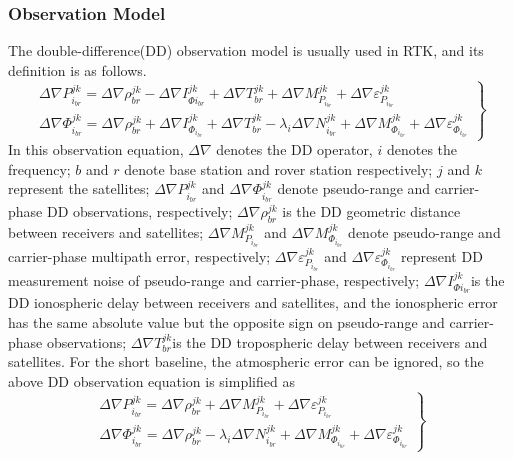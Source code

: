 \documentclass[final,3p,times]{elsarticle}
\begin{document}
	\subsubsection{Observation Model}
	The double-difference(DD) observation model is usually used in RTK, and its definition is as follows\cite{teunissen2017springer}.
	\begin{equation}
	\left. \begin{array}{l}
	\Delta \nabla P_{{i_{br}}}^{jk} = \Delta \nabla \rho _{br}^{jk} - \Delta \nabla I_{\Phi {i_{br}}}^{jk} + \Delta \nabla  T_{br}^{jk} + \Delta \nabla  M_{{P_{{i_{br}}}}}^{jk} + \Delta \nabla \varepsilon _{{P_{{i_{br}}}}}^{jk}\\
	\Delta \nabla \Phi _{{i_{br}}}^{jk} = \Delta \nabla \rho _{br}^{jk} + \Delta \nabla I_{{\Phi _{{i_{br}}}}}^{jk} + \Delta \nabla T_{br}^{jk} - {\lambda _i}\Delta \nabla N_{{i_{br}}}^{jk} + \Delta \nabla  M_{{\Phi _{{i_{br}}}}}^{jk} + \Delta \nabla \varepsilon _{{\Phi _{{i_{br}}}}}^{jk}
	\end{array} \right\}
	\label{eq_dd_obs}
	\end{equation}
	In this observation equation, $\Delta \nabla $ denotes the DD operator, $i$ denotes the frequency; $b$ and $r$ denote base station and rover station respectively; $j$ and $k$ represent the satellites;
	$\Delta \nabla P_{{{i}_{br}}}^{jk}$ and $\Delta \nabla \Phi _{{{i}_{br}}}^{jk}$ denote pseudo-range and carrier-phase DD observations, respectively; 
	$\Delta \nabla \rho _{br}^{jk}$ is the DD geometric distance between receivers and satellites; 
	$\Delta \nabla  M_{{{P}_{{{i}_{br}}}}}^{jk}$ and $\Delta \nabla  M_{{{\Phi }_{{{i}_{br}}}}}^{jk}$ denote pseudo-range and carrier-phase multipath error, respectively; 
	$\Delta \nabla \varepsilon _{{{P}_{{{i}_{br}}}}}^{jk}$ and $\Delta \nabla \varepsilon _{{{\Phi }_{{{i}_{br}}}}}^{jk}$ represent DD measurement noise of pseudo-range and carrier-phase, respectively; 
	$\Delta \nabla  I_{\Phi {{i}_{br}}}^{jk}$is the DD ionospheric delay between receivers and satellites, and the ionospheric error has the same absolute value but the opposite sign on pseudo-range and carrier-phase observations\cite{teunissen2017springer}; $\Delta \nabla T_{br}^{jk}$is the DD tropospheric delay between receivers and satellites. 
	For the short baseline, the atmospheric error can be ignored, so the above DD observation equation is simplified as
	\begin{equation}
	\left. \begin{array}{l}
	\Delta \nabla P_{{i_{br}}}^{jk} = \Delta \nabla \rho _{br}^{jk} + \Delta \nabla  M_{{P_{{i_{br}}}}}^{jk} + \Delta \nabla \varepsilon _{{P_{{i_{br}}}}}^{jk}\\
	\Delta \nabla \Phi _{{i_{br}}}^{jk} = \Delta \nabla \rho _{br}^{jk} - {\lambda _i}\Delta \nabla N_{{i_{br}}}^{jk} + \Delta \nabla  M_{{\Phi _{{i_{br}}}}}^{jk} + \Delta \nabla \varepsilon _{{\Phi _{{i_{br}}}}}^{jk}\end{array} \right\}
	\label{eq_dd_obs_simplified}
	\end{equation}
\end{document}
